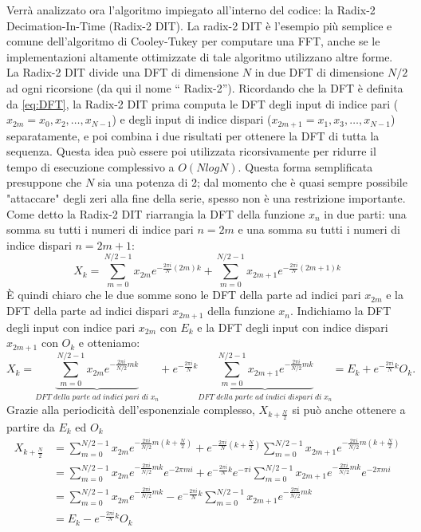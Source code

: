 \documentclass[12pt,a4paper, twoside, openright]{report}
\begin{document}
Verrà analizzato ora l'algoritmo impiegato all'interno del codice: la Radix-2 Decimation-In-Time (Radix-2 DIT).
La radix-2 DIT è l’esempio più semplice e comune dell'algoritmo di Cooley-Tukey per computare una FFT, anche se le implementazioni altamente ottimizzate di tale algoritmo utilizzano altre forme.
La Radix-2 DIT divide una DFT di dimensione $N$ in due DFT di dimensione $N/2$ ad ogni ricorsione (da qui il nome “ Radix-2”).
Ricordando che la DFT è definita da \ref{eq:DFT}, la Radix-2 DIT prima computa le DFT degli input di indice pari ($x_{2m}=x_0 , x_2 ,\ldots , x_{N-1}$) e degli input di indice dispari ($x_{2m+1}= x_1 , x_3 ,\ldots , x_{N-1}$) separatamente, e poi combina i due risultati per ottenere la DFT di tutta la sequenza.
Questa idea può essere poi utilizzata ricorsivamente per ridurre il tempo di esecuzione complessivo a $O(N log N)$.
Questa forma semplificata presuppone che $N$ sia una potenza di 2; dal momento che è quasi sempre possibile "attaccare" degli zeri alla fine della serie, spesso non è una restrizione importante.
Come detto la Radix-2 DIT riarrangia la DFT della funzione $x_n$ in due parti: una somma su tutti i numeri di indice pari $n=2m$ e una somma su tutti i numeri di indice dispari $n=2m+1$:
\begin{equation}
	X_k=\sum_{m=0}^{N/2-1} x_{2m} e^{-\frac{2\pi i}{N} (2m)k} + \sum_{m=0}^{N/2-1} 				x_{2m+1} e^{-\frac{2 \pi i}{N} (2m+1)k}
\end{equation}
È quindi chiaro che le due somme sono le DFT della parte ad indici pari $x_{2m}$ e la DFT della parte ad indici dispari $x_{2m+1}$ della funzione $x_n$.
Indichiamo la DFT degli input con indice pari $x_{2m}$ con $E_k$ e la DFT degli input con indice dispari $x_{2m+1}$ con $O_k$ e otteniamo:
\begin{equation}
	X_k=\underbrace{\sum_{m=0}^{N/2-1} x_{2m} e^{-\frac{2 \pi i}{N/2}mk}}_{DFT\; della			\; parte\; ad\; indici\; pari\; di\; x_n} + e^{-\frac{2 \pi i}{N}k} 						\underbrace{\sum_{m=0}^{N/2-1} x_{2m+1}e^{-\frac{2 \pi i}{N/2}mk}}_{DFT\; della\; 			parte\; ad\; indici\; dispari\; di\; x_n} = E_k + e^{-\frac{2 \pi i}{N}k} O_k .
\end{equation}
Grazie alla periodicità dell’esponenziale complesso, $X_{k+\frac{N}{2}}$ si può anche ottenere a partire da $E_k$ ed $O_k$
\begin{align}
	X_{k+\frac{N}{2}} &= \sum_{m=0}^{N/2-1} x_{2m} e^{-\frac{2 \pi i}{N/2}m(k+\frac{N}			{2})} + e^{-\frac{2 \pi i}{N}(k+\frac{N}{2})} \sum_{m=0}^{N/2-1}  x_{2m+1} e^{-				\frac{2 \pi i}{N/2}m(k+\frac{N}{2})} \\
	&=\sum_{m=0}^{N/2-1} x_{2m} e^{-\frac{2 \pi i}{N/2}mk} e^{-2 \pi mi} + e^{-\frac{2 			\pi i}{N}k} e^{-\pi i} \sum_{m=0}^{N/2-1} x_{2m+1} e^{-\frac{2\pi i}{N/2} mk} e^{-2 	\pi mi} \\
	&=\sum_{m=0}^{N/2-1} x_{2m} e^{-\frac{2 \pi i}{N/2}mk} - e^{-\frac{2 \pi i}{N}k} 			\sum_{m=0}^{N/2-1} x_{2m+1} e^{-\frac{2\pi i}{N/2} mk} \\
	&=E_k - e^{-\frac{2 \pi i}{N}k} O_k
\end{align}
\end{document}
